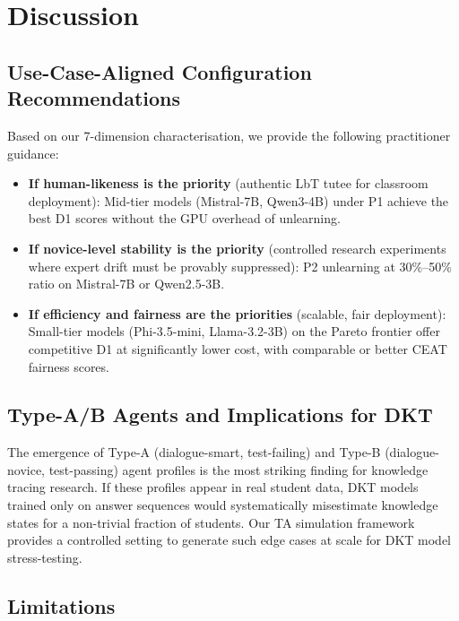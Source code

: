 \documentclass[10pt,twocolumn]{IEEEtran}
\begin{document}
\section{Discussion}

\subsection{Use-Case-Aligned Configuration Recommendations}

Based on our 7-dimension characterisation, we provide the following
practitioner guidance:

\begin{itemize}
\item \textbf{If human-likeness is the priority} (authentic LbT tutee for classroom
  deployment): Mid-tier models (Mistral-7B, Qwen3-4B) under P1 achieve the best
  D1 scores without the GPU overhead of unlearning.

\item \textbf{If novice-level stability is the priority} (controlled research
  experiments where expert drift must be provably suppressed): P2 unlearning at
  30\%--50\% ratio on Mistral-7B or Qwen2.5-3B.

\item \textbf{If efficiency and fairness are the priorities} (scalable, fair
  deployment): Small-tier models (Phi-3.5-mini, Llama-3.2-3B) on the Pareto frontier
  offer competitive D1 at significantly lower cost, with comparable or better
  CEAT fairness scores.
\end{itemize}

\subsection{Type-A/B Agents and Implications for DKT}

The emergence of Type-A (dialogue-smart, test-failing) and Type-B (dialogue-novice,
test-passing) agent profiles is the most striking finding for knowledge tracing
research. If these profiles appear in real student data, DKT models trained only
on answer sequences would systematically misestimate knowledge states for a
non-trivial fraction of students. Our TA simulation framework provides a controlled
setting to generate such edge cases at scale for DKT model stress-testing.

\subsection{Limitations}
\end{document}
